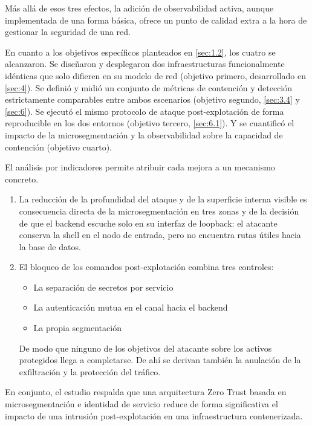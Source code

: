\documentclass[11pt,spanish,listoffigures,listoftables]{tfgetsinf}
\begin{document}
        Más allá de esos tres efectos, la adición de observabilidad activa, aunque implementada de una forma básica, ofrece un punto de calidad extra a la hora de gestionar la seguridad de una red.

        En cuanto a los objetivos específicos planteados en \cref{sec:1.2}, los cuatro se alcanzaron. Se diseñaron y desplegaron dos infraestructuras funcionalmente idénticas que solo difieren en su modelo de red (objetivo primero, desarrollado en \cref{sec:4}). Se definió y midió un conjunto de métricas de contención y detección estrictamente comparables entre ambos escenarios (objetivo segundo, \cref{sec:3.4} y \cref{sec:6}). Se ejecutó el mismo protocolo de ataque post-explotación de forma reproducible en los dos entornos (objetivo tercero, \cref{sec:6.1}). Y se cuantificó el impacto de la microsegmentación y la observabilidad sobre la capacidad de contención (objetivo cuarto).

        El análisis por indicadores permite atribuir cada mejora a un mecanismo concreto. 
        \begin{enumerate}
            \item La reducción de la profundidad del ataque y de la superficie interna visible es consecuencia directa de la microsegmentación en tres zonas y de la decisión de que el backend escuche solo en su interfaz de loopback: el atacante conserva la shell en el nodo de entrada, pero no encuentra rutas útiles hacia la base de datos. 
            \item El bloqueo de los comandos post-explotación combina tres controles: 
                \begin{itemize}
                    \item La separación de secretos por servicio
                    \item La autenticación mutua en el canal hacia el backend 
                    \item La propia segmentación
                \end{itemize}
                De modo que ninguno de los objetivos del atacante sobre los activos protegidos llega a completarse. De ahí se derivan también la anulación de la exfiltración y la protección del tráfico.
        \end{enumerate}
        En conjunto, el estudio respalda que una arquitectura Zero Trust basada en microsegmentación e identidad de servicio reduce de forma significativa el impacto de una intrusión post-explotación en una infraestructura contenerizada.
\end{document}
